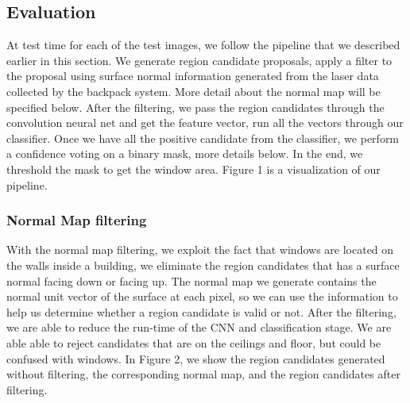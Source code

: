 \documentclass[10pt,twocolumn,letterpaper]{article}
\begin{document}
\subsection{Evaluation}
At test time for each of the test images, we follow the pipeline that we described earlier in this section. We generate region candidate proposals, apply a filter to the proposal using surface normal information generated from the laser data collected by the backpack system. More detail about the normal map will be specified below. After the filtering, we pass the region candidates through the convolution neural net and get the feature vector, run all the vectors through our classifier. Once we have all the positive candidate from the classifier, we perform a confidence voting on a binary mask, more details below. In the end, we threshold the mask to get the window area. Figure 1 is a visualization of our pipeline.



 
\subsubsection{Normal Map filtering}
With the normal map filtering, we exploit the fact that windows are located on the walls inside a building, we eliminate the region candidates that has a surface normal facing down or facing up. The normal map we generate contains the normal unit vector of the surface at each pixel, so we can use the information to help us determine whether a region candidate is valid or not. After the filtering, we are able to reduce the run-time of the CNN and classification stage. We are able able to reject candidates that are on the ceilings and floor, but could be confused with windows. In Figure 2, we show the region candidates generated without filtering, the corresponding normal map, and the region candidates after filtering.
\end{document}
